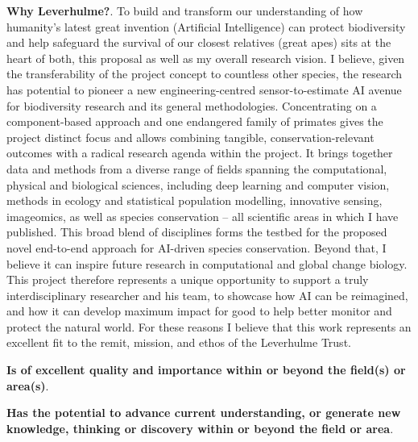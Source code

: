 \textbf{Why Leverhulme?}. To build and transform our understanding of how humanity’s latest great invention (Artificial Intelligence) can protect biodiversity and help safeguard the survival of our closest relatives (great apes) sits at the heart of both, this proposal as well as my overall research vision. I believe, given the transferability of the project concept to countless other species, the research has potential to pioneer a new engineering-centred sensor-to-estimate AI avenue for biodiversity research and its general methodologies. Concentrating on a component-based approach and one endangered family of primates gives the project distinct focus and allows combining tangible, conservation-relevant outcomes with a radical research agenda within the project. It brings together data and methods from a diverse range of fields spanning the computational, physical and biological sciences, including deep learning and computer vision, methods in ecology and statistical population modelling, innovative sensing, imageomics, as well as species conservation – all scientific areas in which I have published. This broad blend of disciplines forms the testbed for the proposed novel end-to-end approach for AI-driven species conservation. Beyond that, I believe it can inspire future research in computational and global change biology. This project therefore represents a unique opportunity to support a truly interdisciplinary researcher and his team, to showcase how AI can be reimagined, and how it can develop maximum impact for good to help better monitor and protect the natural world. For these reasons I believe that this work represents an excellent fit to the remit, mission, and ethos of the Leverhulme Trust.


\textbf{Is of excellent quality and importance within or beyond the field(s) or area(s)}.

\textbf{Has the potential to advance current understanding, or generate new knowledge, thinking or discovery within or beyond the field or area}.

